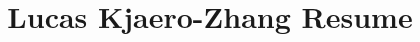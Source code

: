 \documentclass[margin]{res}
\title{Lucas Kjaero-Zhang Resume}
\begin{document}


\address{(619) 905-1772\\Copenhagen, Denmark}
\address{\href{mailto:lucas@lucaskjaerozhang.com}{Lucas@LucasKjaeroZhang.com}\\\href{https://www.lucaskjaerozhang.com}{www.LucasKjaeroZhang.com}}


\end{document}
